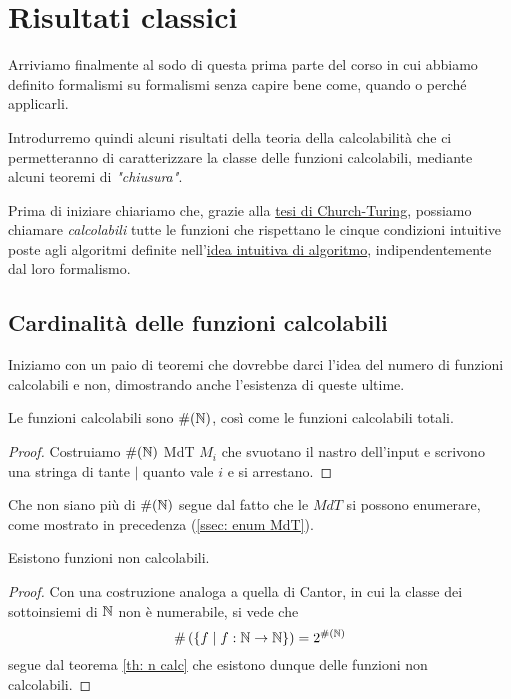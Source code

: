 \section{Risultati classici}
Arriviamo finalmente al sodo di questa prima parte del corso in
cui abbiamo definito formalismi su formalismi senza capire bene
come, quando o perché applicarli.

Introdurremo quindi alcuni risultati della teoria della
calcolabilità che ci permetteranno di caratterizzare la classe
delle funzioni calcolabili, mediante alcuni teoremi di
\emph{"chiusura"}.

Prima di iniziare chiariamo che, grazie alla
\hyperref[th: church-turing]{tesi di Church-Turing}, possiamo
chiamare \emph{calcolabili} tutte le funzioni che rispettano
le cinque condizioni intuitive poste agli algoritmi definite
nell'\hyperref[sec: algoritmo]{idea intuitiva di algoritmo},
indipendentemente dal loro formalismo.

\subsection{Cardinalità delle funzioni calcolabili}
Iniziamo con un paio di teoremi che dovrebbe darci l'idea del
numero di funzioni calcolabili e non, dimostrando anche
l'esistenza di queste ultime.

\begin{theorem} \label{th: n calc}
	Le funzioni calcolabili sono $\#(\mathbb{N})$, così come le funzioni
	calcolabili totali.
	\begin{proof}
		Costruiamo $\#(\mathbb{N})$ MdT $M_i$ che svuotano il nastro
		dell'input e scrivono una stringa di tante $|$ quanto
		vale $i$ e si arrestano.
	\end{proof}
\end{theorem}

Che non siano più di $\#(\mathbb{N})$ segue dal fatto che le $MdT$
si possono enumerare, come mostrato in precedenza
(\ref{ssec: enum MdT}).

\begin{theorem} \label{th: exists non calc}
	Esistono funzioni non calcolabili.
	\begin{proof}
		Con una costruzione analoga a quella di Cantor, in cui
		la classe dei sottoinsiemi di $\mathbb{N}$ non è numerabile,
		si vede che
		\[
			\# \left( \{ f \mid f : \mathbb{N} \to \mathbb{N} \} \right) =
			2^{\#(\mathbb{N})}
		\]
		segue dal teorema \ref{th: n calc} che esistono dunque
		delle funzioni non calcolabili.
	\end{proof}
\end{theorem}

